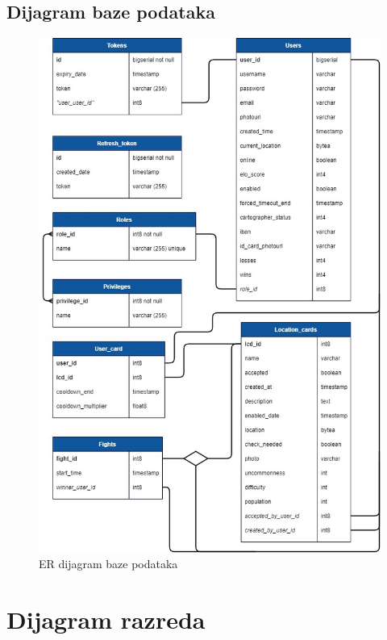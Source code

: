 			\subsection{Dijagram baze podataka}
								
				\begin{figure}[H]
					\centering
					\includegraphics[scale=0.55]{slike/GeoFighterModel} 
					\caption{ER dijagram baze podataka}
					\label{fig:ERmodel}
				\end{figure}				
				
				
			
			\eject
			
			
		\section{Dijagram razreda}
		
